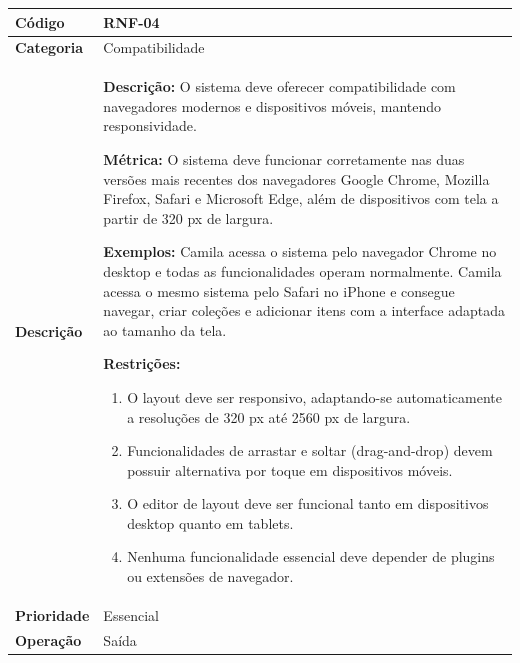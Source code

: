 \FloatBarrier
\begin{quadro}[h!]
\caption{RNF-04 -- Compatibilidade e Responsividade}
\label{quad:rnf04}
\begin{tabular}{|p{3.2cm}|p{11.8cm}|}
\hline
\textbf{Código}     & RNF-04 \\ \hline
\textbf{Categoria}  & Compatibilidade \\ \hline
\textbf{Descrição}  &
\textbf{Descrição:} O sistema deve oferecer compatibilidade com navegadores modernos e dispositivos móveis, mantendo responsividade.

\textbf{Métrica:} O sistema deve funcionar corretamente nas duas versões mais recentes dos navegadores Google Chrome, Mozilla Firefox, Safari e Microsoft Edge, além de dispositivos com tela a partir de 320 px de largura.

\textbf{Exemplos:} Camila acessa o sistema pelo navegador Chrome no desktop e todas as funcionalidades operam normalmente.
Camila acessa o mesmo sistema pelo Safari no iPhone e consegue navegar, criar coleções e adicionar itens com a interface adaptada ao tamanho da tela.

\textbf{Restrições:}
\begin{enumerate}[nosep,leftmargin=1.2em,topsep=2pt,partopsep=0pt,parsep=0pt,itemsep=1pt]
  \item O layout deve ser responsivo, adaptando-se automaticamente a resoluções de 320 px até 2560 px de largura.
  \item Funcionalidades de arrastar e soltar (drag-and-drop) devem possuir alternativa por toque em dispositivos móveis.
  \item O editor de layout deve ser funcional tanto em dispositivos desktop quanto em tablets.
  \item Nenhuma funcionalidade essencial deve depender de plugins ou extensões de navegador.
\end{enumerate} \\ \hline
\textbf{Prioridade} & Essencial \\ \hline
\textbf{Operação}   & Saída \\ \hline
\end{tabular}
\end{quadro}

